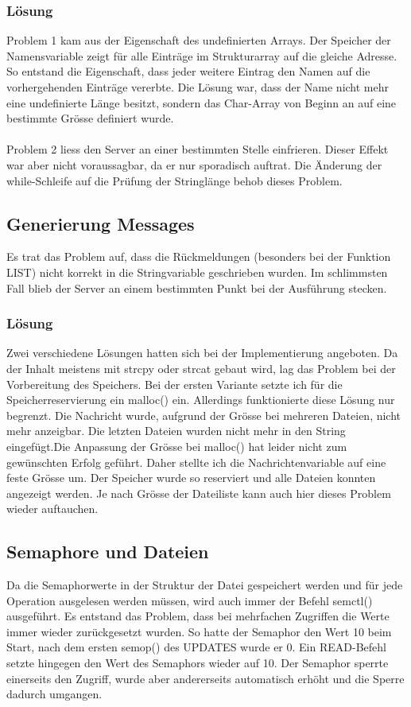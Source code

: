 \documentclass[12pt,a4paper,ngerman]{report}
\begin{document}
\subsubsection{Lösung}
Problem 1 kam aus der Eigenschaft des undefinierten Arrays. Der Speicher der Namensvariable zeigt für alle Einträge im Strukturarray auf die gleiche Adresse. So entstand die Eigenschaft, dass jeder weitere Eintrag den Namen auf die vorhergehenden Einträge vererbte. Die Lösung war, dass der Name nicht mehr eine undefinierte Länge besitzt, sondern das Char-Array von Beginn an auf eine bestimmte Grösse definiert wurde.\\
\\
Problem 2 liess den Server an einer bestimmten Stelle einfrieren. Dieser Effekt war aber nicht voraussagbar, da er nur sporadisch auftrat. Die Änderung der while-Schleife auf die Prüfung der Stringlänge behob dieses Problem. 
\subsection{Generierung Messages}
Es trat das Problem auf, dass die Rückmeldungen (besonders bei der Funktion LIST) nicht korrekt in die Stringvariable geschrieben wurden. Im schlimmsten Fall blieb der Server an einem bestimmten Punkt bei der Ausführung stecken.
\subsubsection{Lösung}
Zwei verschiedene Lösungen hatten sich bei der Implementierung angeboten. Da der Inhalt meistens mit strcpy oder strcat gebaut wird, lag das Problem bei der Vorbereitung des Speichers. Bei der ersten Variante setzte ich für die Speicherreservierung ein malloc() ein. Allerdings funktionierte diese Lösung nur begrenzt. Die Nachricht wurde, aufgrund der Grösse bei mehreren Dateien, nicht mehr anzeigbar. Die letzten Dateien wurden nicht mehr in den String eingefügt.Die Anpassung der Grösse bei malloc() hat leider nicht zum gewünschten Erfolg geführt. Daher stellte ich die Nachrichtenvariable auf eine feste Grösse um. Der Speicher wurde so reserviert und alle Dateien konnten angezeigt werden. Je nach Grösse der Dateiliste kann auch hier dieses Problem wieder auftauchen.
\newpage
\subsection{Semaphore und Dateien}
Da die Semaphorwerte in der Struktur der Datei gespeichert werden und für jede Operation ausgelesen werden müssen, wird auch immer der Befehl semctl() ausgeführt. Es entstand das Problem, dass bei mehrfachen Zugriffen die Werte immer wieder zurückgesetzt wurden. So hatte der Semaphor den Wert 10 beim Start, nach dem ersten semop() des UPDATES wurde er 0. Ein READ-Befehl setzte hingegen den Wert des Semaphors wieder auf 10. Der Semaphor sperrte einerseits den Zugriff, wurde aber andererseits automatisch erhöht und die Sperre dadurch umgangen.
\end{document}
